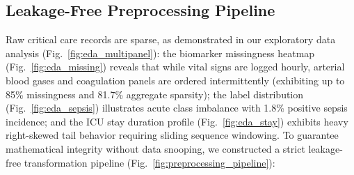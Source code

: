 \documentclass[journal,twocolumn,10pt]{IEEEtran}
\begin{document}
\subsection{Leakage-Free Preprocessing Pipeline}
Raw critical care records are sparse, as demonstrated in our exploratory data analysis (Fig.~\ref{fig:eda_multipanel}): the biomarker missingness heatmap (Fig.~\ref{fig:eda_missing}) reveals that while vital signs are logged hourly, arterial blood gases and coagulation panels are ordered intermittently (exhibiting up to 85\% missingness and 81.7\% aggregate sparsity); the label distribution (Fig.~\ref{fig:eda_sepsis}) illustrates acute class imbalance with 1.8\% positive sepsis incidence; and the ICU stay duration profile (Fig.~\ref{fig:eda_stay}) exhibits heavy right-skewed tail behavior requiring sliding sequence windowing. To guarantee mathematical integrity without data snooping, we constructed a strict leakage-free transformation pipeline (Fig.~\ref{fig:preprocessing_pipeline}):
\end{document}
